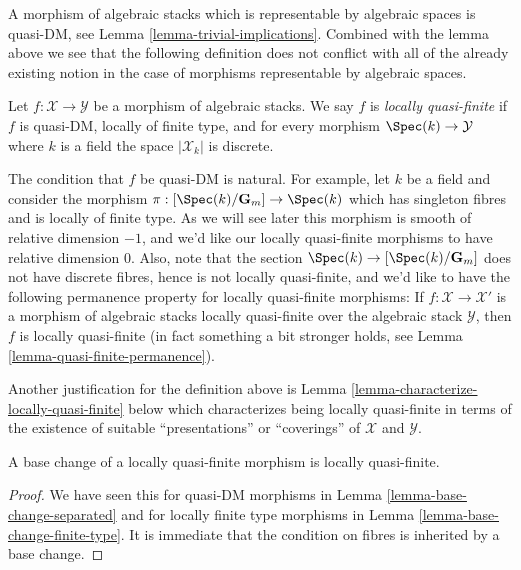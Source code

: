\noindent
A morphism of algebraic stacks which is representable by algebraic spaces
is quasi-DM, see
Lemma \ref{lemma-trivial-implications}.
Combined with the lemma above we see that the following definition
does not conflict with all of the already existing notion in the case
of morphisms representable by algebraic spaces.

\begin{definition}
\label{definition-quasi-finite}
Let $f : \mathcal{X} \to \mathcal{Y}$ be a morphism of algebraic stacks.
We say $f$ is {\it locally quasi-finite} if $f$ is quasi-DM, locally of
finite type, and for every morphism $\Spec(k) \to \mathcal{Y}$
where $k$ is a field the space $|\mathcal{X}_k|$ is discrete.
\end{definition}

\noindent
The condition that $f$ be quasi-DM is natural. For example, let $k$ be
a field and consider the morphism
$\pi : [\Spec(k)/\mathbf{G}_m] \to \Spec(k)$
which has singleton fibres and is locally of finite type. As we will see
later this morphism is smooth of relative dimension $-1$, and we'd
like our locally quasi-finite morphisms to have relative dimension $0$.
Also, note that the section $\Spec(k) \to [\Spec(k)/\mathbf{G}_m]$
does not have discrete fibres, hence is not locally quasi-finite, and we'd
like to have the following permanence property for locally quasi-finite
morphisms: If $f : \mathcal{X} \to \mathcal{X}'$ is a morphism of algebraic
stacks locally quasi-finite over the algebraic stack $\mathcal{Y}$, then
$f$ is locally quasi-finite (in fact something a bit stronger holds, see
Lemma \ref{lemma-quasi-finite-permanence}).

\medskip\noindent
Another justification for the definition above is
Lemma \ref{lemma-characterize-locally-quasi-finite}
below which characterizes being locally quasi-finite in terms of the
existence of suitable ``presentations'' or ``coverings'' of
$\mathcal{X}$ and $\mathcal{Y}$.

\begin{lemma}
\label{lemma-base-change-locally-quasi-finite}
A base change of a locally quasi-finite morphism is locally quasi-finite.
\end{lemma}

\begin{proof}
We have seen this for quasi-DM morphisms in
Lemma \ref{lemma-base-change-separated}
and for locally finite type morphisms in
Lemma \ref{lemma-base-change-finite-type}.
It is immediate that the condition on fibres is inherited by a base change.
\end{proof}

